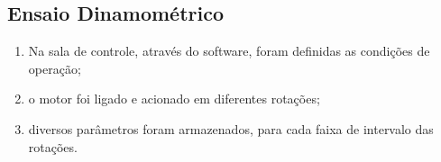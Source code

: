\subsection{Ensaio Dinamométrico}

\begin{enumerate}[label=\itshape\roman*.]
    \item Na sala de controle, através do software, foram definidas as condições de operação;
    \item o motor foi ligado e acionado em diferentes rotações;
    \item diversos parâmetros foram armazenados, para cada faixa de intervalo das rotações.
\end{enumerate}
